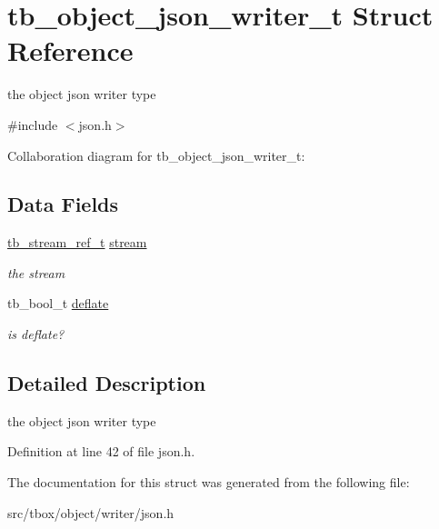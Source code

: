 \hypertarget{structtb__object__json__writer__t}{\section{tb\-\_\-object\-\_\-json\-\_\-writer\-\_\-t Struct Reference}
\label{structtb__object__json__writer__t}
}


the object json writer type  




{\ttfamily \#include $<$json.\-h$>$}



Collaboration diagram for tb\-\_\-object\-\_\-json\-\_\-writer\-\_\-t\-:
\subsection*{Data Fields}
\begin{DoxyCompactItemize}
\item 
\hypertarget{structtb__object__json__writer__t_adc0c007f46c19d024610ce01763b5edc}{\hyperlink{structtb__stream__ref__t}{tb\-\_\-stream\-\_\-ref\-\_\-t} \hyperlink{structtb__object__json__writer__t_adc0c007f46c19d024610ce01763b5edc}{stream}}\label{structtb__object__json__writer__t_adc0c007f46c19d024610ce01763b5edc}

\begin{DoxyCompactList}\small\item\em the stream \end{DoxyCompactList}\item 
\hypertarget{structtb__object__json__writer__t_ade794159a05f8ad7a8459ba3812b3804}{tb\-\_\-bool\-\_\-t \hyperlink{structtb__object__json__writer__t_ade794159a05f8ad7a8459ba3812b3804}{deflate}}\label{structtb__object__json__writer__t_ade794159a05f8ad7a8459ba3812b3804}

\begin{DoxyCompactList}\small\item\em is deflate? \end{DoxyCompactList}\end{DoxyCompactItemize}


\subsection{Detailed Description}
the object json writer type 

Definition at line 42 of file json.\-h.



The documentation for this struct was generated from the following file\-:\begin{DoxyCompactItemize}
\item 
src/tbox/object/writer/json.\-h\end{DoxyCompactItemize}
